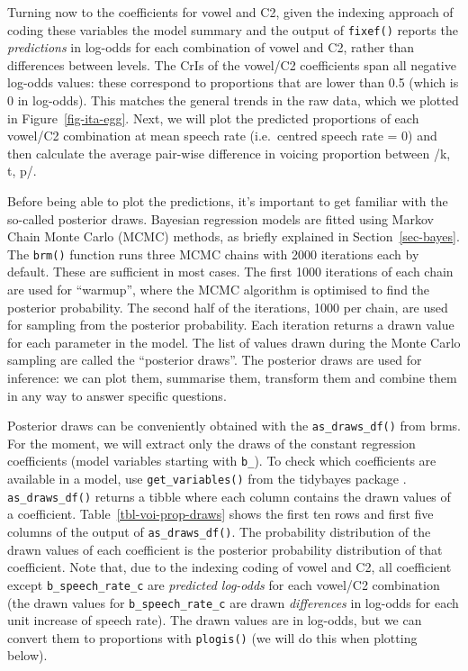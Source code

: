 \documentclass[
  authoryear,
  preprint,
  3p]{elsarticle}
\begin{document}
Turning now to the coefficients for vowel and C2, given the indexing
approach of coding these variables the model summary and the output of
\texttt{fixef()} reports the \emph{predictions} in log-odds for each
combination of vowel and C2, rather than differences between levels. The
CrIs of the vowel/C2 coefficients span all negative log-odds values:
these correspond to proportions that are lower than 0.5 (which is 0 in
log-odds). This matches the general trends in the raw data, which we
plotted in Figure~\ref{fig-ita-egg}. Next, we will plot the predicted
proportions of each vowel/C2 combination at mean speech rate
(i.e.~centred speech rate = 0) and then calculate the average pair-wise
difference in voicing proportion between /k, t, p/.

Before being able to plot the predictions, it's important to get
familiar with the so-called posterior draws. Bayesian regression models
are fitted using Markov Chain Monte Carlo (MCMC) methods, as briefly
explained in Section~\ref{sec-bayes}. The \texttt{brm()} function runs
three MCMC chains with 2000 iterations each by default. These are
sufficient in most cases. The first 1000 iterations of each chain are
used for ``warmup'', where the MCMC algorithm is optimised to find the
posterior probability. The second half of the iterations, 1000 per
chain, are used for sampling from the posterior probability. Each
iteration returns a drawn value for each parameter in the model. The
list of values drawn during the Monte Carlo sampling are called the
``posterior draws''. The posterior draws are used for inference: we can
plot them, summarise them, transform them and combine them in any way to
answer specific questions.

Posterior draws can be conveniently obtained with the
\texttt{as\_draws\_df()} from brms. For the moment, we will extract only
the draws of the constant regression coefficients (model variables
starting with \texttt{b\_}). To check which coefficients are available
in a model, use \texttt{get\_variables()} from the tidybayes package
\citep{kay2019}. \texttt{as\_draws\_df()} returns a tibble where each
column contains the drawn values of a coefficient.
Table~\ref{tbl-voi-prop-draws} shows the first ten rows and first five
columns of the output of \texttt{as\_draws\_df()}. The probability
distribution of the drawn values of each coefficient is the posterior
probability distribution of that coefficient. Note that, due to the
indexing coding of vowel and C2, all coefficient except
\texttt{b\_speech\_rate\_c} are \emph{predicted log-odds} for each
vowel/C2 combination (the drawn values for \texttt{b\_speech\_rate\_c}
are drawn \emph{differences} in log-odds for each unit increase of
speech rate). The drawn values are in log-odds, but we can convert them
to proportions with \texttt{plogis()} (we will do this when plotting
below).
\end{document}
